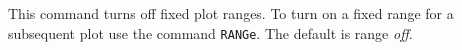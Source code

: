 \headb

This command turns off fixed plot ranges.  To turn on a fixed range
for a subsequent plot use the command \texttt{RANGe}.
The default is range \textit{off}.
\vfill
\eject
